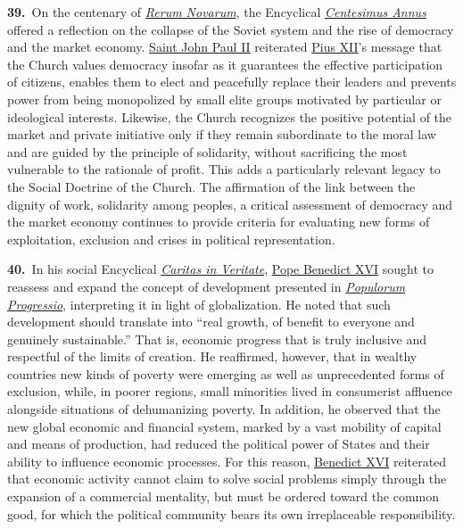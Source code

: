 \documentclass{article}
\begin{document}
\textbf{39.}\ On the centenary of \href{https://www.vatican.va/content/leo-xiii/en/encyclicals/documents/hf_l-xiii_enc_15051891_rerum-novarum.html}{\emph{Rerum Novarum}}, the Encyclical \href{https://www.vatican.va/content/john-paul-ii/en/encyclicals/documents/hf_jp-ii_enc_01051991_centesimus-annus.html}{\emph{Centesimus Annus}} offered a reflection on the collapse of the Soviet system and the rise of democracy and the market economy. \href{https://www.vatican.va/content/john-paul-ii/en.html}{Saint John Paul II} reiterated \href{https://www.vatican.va/content/pius-xii/en.html}{Pius XII}'s message that the Church values democracy insofar as it guarantees the effective participation of citizens, enables them to elect and peacefully replace their leaders and prevents power from being monopolized by small elite groups motivated by particular or ideological interests.\cite{n40} Likewise, the Church recognizes the positive potential of the market and private initiative only if they remain subordinate to the moral law and are guided by the principle of solidarity, without sacrificing the most vulnerable to the rationale of profit.\cite{n41} This adds a particularly relevant legacy to the Social Doctrine of the Church. The affirmation of the link between the dignity of work, solidarity among peoples, a critical assessment of democracy and the market economy continues to provide criteria for evaluating new forms of exploitation, exclusion and crises in political representation.

\textbf{40.}\ In his social Encyclical \href{https://www.vatican.va/content/benedict-xvi/en/encyclicals/documents/hf_ben-xvi_enc_20090629_caritas-in-veritate.html}{\emph{Caritas in Veritate}}, \href{https://www.vatican.va/content/benedict-xvi/en.html}{Pope Benedict XVI} sought to reassess and expand the concept of development presented in \href{https://www.vatican.va/content/paul-vi/en/encyclicals/documents/hf_p-vi_enc_26031967_populorum.html}{\emph{Populorum Progressio}}, interpreting it in light of globalization. He noted that such development should translate into ``real growth, of benefit to everyone and genuinely sustainable.''\cite{n42} That is, economic progress that is truly inclusive and respectful of the limits of creation. He reaffirmed, however, that in wealthy countries new kinds of poverty were emerging as well as unprecedented forms of exclusion, while, in poorer regions, small minorities lived in consumerist affluence alongside situations of dehumanizing poverty.\cite{n43} In addition, he observed that the new global economic and financial system, marked by a vast mobility of capital and means of production, had reduced the political power of States and their ability to influence economic processes.\cite{n44} For this reason, \href{https://www.vatican.va/content/benedict-xvi/en.html}{Benedict XVI} reiterated that economic activity cannot claim to solve social problems simply through the expansion of a commercial mentality, but must be ordered toward the common good, for which the political community bears its own irreplaceable responsibility.\cite{n45}
\end{document}

